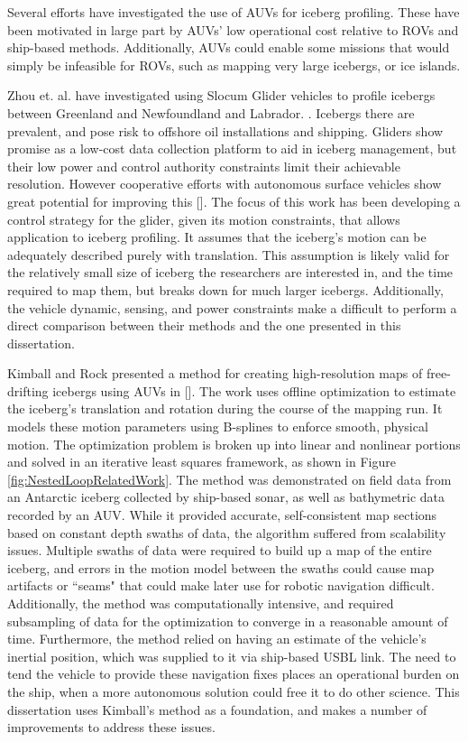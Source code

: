Several efforts have investigated the use of AUVs for iceberg profiling. These have been motivated in large part by AUVs' low operational cost relative to ROVs and ship-based methods. Additionally, AUVs could enable some missions that would simply be infeasible for ROVs, such as mapping very large icebergs, or ice islands. 

Zhou et. al. have investigated using Slocum Glider vehicles to profile icebergs between Greenland and Newfoundland and Labrador. \cite{Zhou2014}. Icebergs there are prevalent, and pose risk to offshore oil installations and shipping. Gliders show promise as a low-cost data collection platform to aid in iceberg management, but their low power and control authority constraints limit their achievable resolution. However cooperative efforts with autonomous surface vehicles show great potential for improving this [\cite{}]. The focus of this work has been developing a control strategy for the glider, given its motion constraints, that allows application to iceberg profiling. It assumes that the iceberg's motion can be adequately described purely with translation. This assumption is likely valid for the relatively small size of iceberg the researchers are interested in, and the time required to map them, but breaks down for much larger icebergs. Additionally, the vehicle dynamic, sensing, and power constraints make a difficult to perform a direct comparison between their methods and the one presented in this dissertation. 

 Kimball and Rock presented a method for creating high-resolution maps of free-drifting icebergs using AUVs in [\cite{Kimball2011}]. The work uses offline optimization to estimate the iceberg's translation and rotation during the course of the mapping run. It models these motion parameters using B-splines \cite{} to enforce smooth, physical motion. The optimization problem is broken up into linear and nonlinear portions and solved in an iterative least squares framework, as shown in Figure \ref{fig:NestedLoopRelatedWork}. The method was demonstrated on field data from an Antarctic iceberg collected by ship-based sonar, as well as bathymetric data recorded by an AUV. While it provided accurate, self-consistent map sections based on constant depth swaths of data, the algorithm suffered from scalability issues. Multiple swaths of data were required to build up a map of the entire iceberg, and errors in the motion model between the swaths could cause map artifacts or ``seams" that could make later use for robotic navigation difficult. Additionally, the method was computationally intensive, and required subsampling of data for the optimization to converge in a reasonable amount of time. Furthermore, the method relied on having an estimate of the vehicle's inertial position, which was supplied to it via ship-based USBL link. The need to tend the vehicle to provide these navigation fixes places an operational burden on the ship, when a more autonomous solution could free it to do other science. This dissertation uses Kimball's method as a foundation, and makes a number of improvements to address these issues. 

